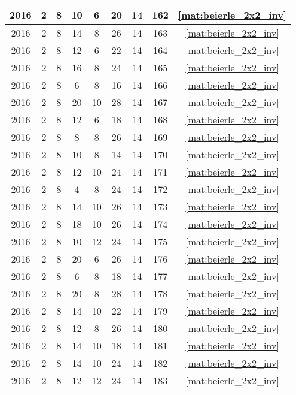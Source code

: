 \begin{longtable}{|c|c|c|c|c|c|c|c|c|}
2016 & 2 & 8 & 10 & 6 & 20 & 14 & 162 & \eqref{mat:beierle_2x2_inv} \\ \hline 
2016 & 2 & 8 & 14 & 8 & 26 & 14 & 163 & \eqref{mat:beierle_2x2_inv} \\ \hline 
2016 & 2 & 8 & 12 & 6 & 22 & 14 & 164 & \eqref{mat:beierle_2x2_inv} \\ \hline 
2016 & 2 & 8 & 16 & 8 & 24 & 14 & 165 & \eqref{mat:beierle_2x2_inv} \\ \hline 
2016 & 2 & 8 & 6 & 8 & 16 & 14 & 166 & \eqref{mat:beierle_2x2_inv} \\ \hline 
2016 & 2 & 8 & 20 & 10 & 28 & 14 & 167 & \eqref{mat:beierle_2x2_inv} \\ \hline 
2016 & 2 & 8 & 12 & 6 & 18 & 14 & 168 & \eqref{mat:beierle_2x2_inv} \\ \hline 
2016 & 2 & 8 & 8 & 8 & 26 & 14 & 169 & \eqref{mat:beierle_2x2_inv} \\ \hline 
2016 & 2 & 8 & 10 & 8 & 14 & 14 & 170 & \eqref{mat:beierle_2x2_inv} \\ \hline 
2016 & 2 & 8 & 12 & 10 & 24 & 14 & 171 & \eqref{mat:beierle_2x2_inv} \\ \hline 
2016 & 2 & 8 & 4 & 8 & 24 & 14 & 172 & \eqref{mat:beierle_2x2_inv} \\ \hline 
2016 & 2 & 8 & 14 & 10 & 26 & 14 & 173 & \eqref{mat:beierle_2x2_inv} \\ \hline 
2016 & 2 & 8 & 18 & 10 & 26 & 14 & 174 & \eqref{mat:beierle_2x2_inv} \\ \hline 
2016 & 2 & 8 & 10 & 12 & 24 & 14 & 175 & \eqref{mat:beierle_2x2_inv} \\ \hline 
2016 & 2 & 8 & 20 & 6 & 26 & 14 & 176 & \eqref{mat:beierle_2x2_inv} \\ \hline 
2016 & 2 & 8 & 6 & 8 & 18 & 14 & 177 & \eqref{mat:beierle_2x2_inv} \\ \hline 
2016 & 2 & 8 & 20 & 8 & 28 & 14 & 178 & \eqref{mat:beierle_2x2_inv} \\ \hline 
2016 & 2 & 8 & 14 & 10 & 22 & 14 & 179 & \eqref{mat:beierle_2x2_inv} \\ \hline 
2016 & 2 & 8 & 12 & 8 & 26 & 14 & 180 & \eqref{mat:beierle_2x2_inv} \\ \hline 
2016 & 2 & 8 & 14 & 10 & 18 & 14 & 181 & \eqref{mat:beierle_2x2_inv} \\ \hline 
2016 & 2 & 8 & 14 & 10 & 24 & 14 & 182 & \eqref{mat:beierle_2x2_inv} \\ \hline 
2016 & 2 & 8 & 12 & 12 & 24 & 14 & 183 & \eqref{mat:beierle_2x2_inv} \\ \hline 

\end{longtable}
